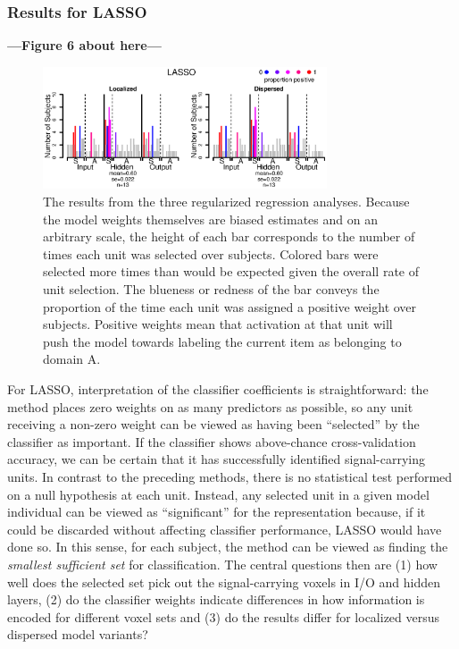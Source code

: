 \subsubsection{Results for LASSO}
\textbf{---Figure 6 about here---}
\begin{figure}
\centering
\includegraphics[width=0.75\textwidth]{figures/lasso_only.eps}
\caption{\label{fig.lasso} The results from the three regularized regression analyses. Because the model weights themselves are biased estimates and on an arbitrary scale, the height of each bar corresponds to the number of times each unit was selected over subjects. Colored bars were selected more times than would be expected given the overall rate of unit selection. The blueness or redness of the bar conveys the proportion of the time each unit was assigned a positive weight over subjects. Positive weights mean that activation at that unit will push the model towards labeling the current item as belonging to domain A.}
\end{figure}

For LASSO, interpretation of the classifier coefficients is straightforward: the method places zero weights on as many predictors as possible, so any unit receiving a non-zero weight can be viewed as having been ``selected'' by the classifier as important. If the classifier shows above-chance cross-validation accuracy, we can be certain that it has successfully identified signal-carrying units. In contrast to the preceding methods, there is no statistical test performed on a null hypothesis at each unit. Instead, any selected unit in a given model individual can be viewed as ``significant'' for the representation because, if it could be discarded without affecting classifier performance, LASSO would have done so. In this sense, for each subject, the method can be viewed as finding the {\em smallest sufficient set} for classification. The central questions then are (1) how well does the selected set pick out the signal-carrying voxels in I/O and hidden layers, (2) do the classifier weights indicate differences in how information is encoded for different voxel sets and (3) do the results differ for localized versus dispersed model variants?

